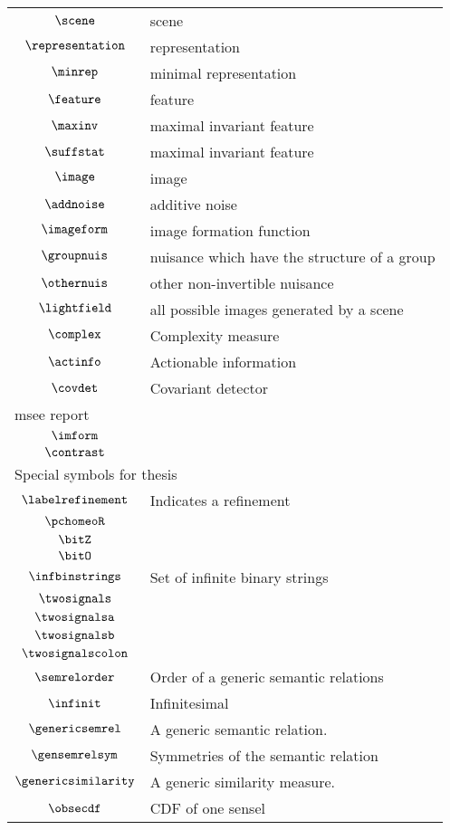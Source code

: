 \begin{longtable}{cl}
 \hline
$\scene$ &  scene\\ 
 $\representation$ &  representation\\ 
 $\minrep$ &  minimal representation\\ 
 $\feature$ &  feature\\ 
 $\maxinv$ &  maximal invariant feature\\ 
 $\suffstat$ &  maximal invariant feature\\ 
 $\image$ &  image\\ 
 $\addnoise$ &  additive noise\\ 
 $\imageform$ &  image formation function\\ 
 $\groupnuis$ &  nuisance which have the structure of a group\\ 
 $\othernuis$ &  other non-invertible nuisance\\ 
 $\lightfield$ &  all possible images generated by a scene\\ 
 $\complex$ &  Complexity measure\\ 
 $\actinfo$ &  Actionable information\\ 
 $\covdet$ &  Covariant detector\\ 
 \multicolumn{2}{l}{msee report}\\ 
 \hline
$\imform$ & \\ 
 $\contrast$ & \\ 
 \multicolumn{2}{l}{Special symbols for thesis}\\ 
 \hline
$\labelrefinement$ &  Indicates a refinement\\ 
 $\pchomeoR$ & \\ 
 $\bitZ$ & \\ 
 $\bitO$ & \\ 
 $\infbinstrings$ &  Set of infinite binary strings\\ 
 $\twosignals$ & \\ 
 $\twosignalsa$ & \\ 
 $\twosignalsb$ & \\ 
 $\twosignalscolon$ & \\ 
 $\semrelorder$ &  Order of a generic semantic relations\\ 
 $\infinit$ &  Infinitesimal\\ 
 $\genericsemrel$ &  A generic semantic relation.\\ 
 $\gensemrelsym$ &  Symmetries of the semantic relation\\ 
 $\genericsimilarity$ &  A generic similarity measure.\\ 
 $\obsecdf$ &  CDF of one sensel\\ 

\end{longtable}
